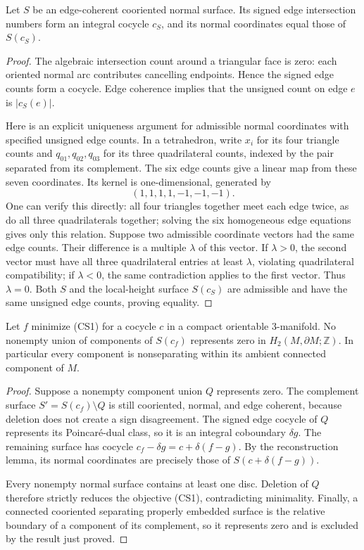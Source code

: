 \begin{lemma}
Let $S$ be an edge-coherent cooriented normal surface. Its signed edge
intersection numbers form an integral cocycle $c_S$, and its normal
coordinates equal those of $S(c_S)$.
\end{lemma}

\begin{proof}
The algebraic intersection count around a triangular face is zero: each
oriented normal arc contributes cancelling endpoints. Hence the signed
edge counts form a cocycle. Edge coherence implies that the unsigned
count on edge $e$ is $|c_S(e)|$.

Here is an explicit uniqueness argument for admissible normal coordinates
with specified unsigned edge counts. In a tetrahedron, write $x_i$ for its
four triangle counts and $q_{01},q_{02},q_{03}$ for its three quadrilateral
counts, indexed by the pair separated from its complement. The six edge
counts give a linear map from these seven coordinates. Its kernel is
one-dimensional, generated by
\[
 (1,1,1,1,-1,-1,-1).
\]
One can verify this directly: all four triangles together meet each edge
twice, as do all three quadrilaterals together; solving the six homogeneous
edge equations gives only this relation. Suppose two admissible coordinate
vectors had the same edge counts. Their difference is a multiple $\lambda$
of this vector. If $\lambda>0$, the second vector must have all three
quadrilateral entries at least $\lambda$, violating quadrilateral
compatibility; if $\lambda<0$, the same contradiction applies to the first
vector. Thus $\lambda=0$. Both $S$ and the local-height surface $S(c_S)$
are admissible and have the same unsigned edge counts, proving equality.
\end{proof}

\begin{theorem}
Let $f$ minimize \textup{(CS1)} for a cocycle $c$ in a compact orientable
$3$-manifold. No nonempty union of components of $S(c_f)$ represents zero
in $H_2(M,\partial M;\mathbb Z)$. In particular every component is
nonseparating within its ambient connected component of $M$.
\end{theorem}

\begin{proof}
Suppose a nonempty component union $Q$ represents zero. The complement
surface $S'=S(c_f)\setminus Q$ is still cooriented, normal, and edge
coherent, because deletion does not create a sign disagreement. The
signed edge cocycle of $Q$ represents its Poincar\'e-dual class, so it is
an integral coboundary $\delta g$. The remaining surface has cocycle
$c_f-\delta g=c+\delta(f-g)$. By the reconstruction lemma, its normal
coordinates are precisely those of $S(c+\delta(f-g))$.

Every nonempty normal surface contains at least one disc. Deletion of $Q$
therefore strictly reduces the objective \textup{(CS1)}, contradicting
minimality. Finally, a connected cooriented separating properly embedded
surface is the relative boundary of a component of its complement, so
it represents zero and is excluded by the result just proved.
\end{proof}

